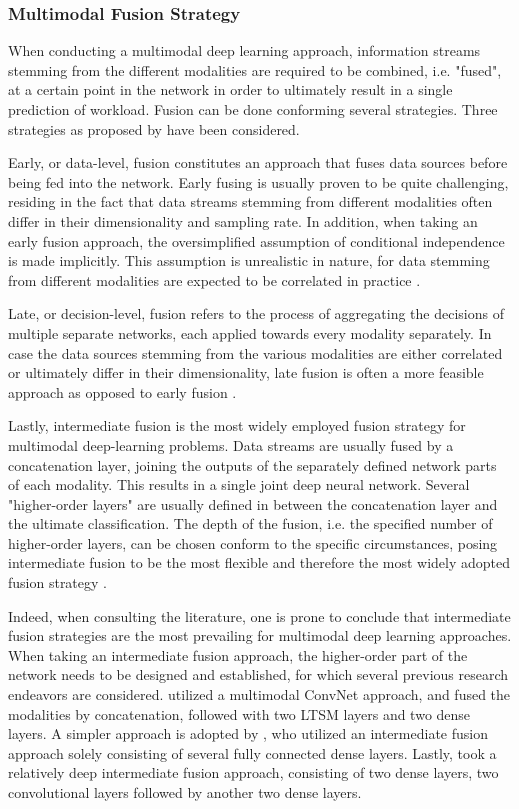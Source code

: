 \documentclass[12pt]{article}
\begin{document}
\subsubsection{Multimodal Fusion Strategy}  
When conducting a multimodal deep learning approach,  information streams stemming from the different modalities are required to be combined, i.e. "fused", at a certain point in the network in order to ultimately result in a single prediction of workload. Fusion can be done conforming several strategies. Three strategies as proposed by  have been considered.

Early, or data-level, fusion constitutes an approach that fuses data sources before being fed into the network. Early fusing is usually proven to be quite challenging, residing in the fact that data streams stemming from different modalities often differ in their dimensionality and sampling rate. In addition, when taking an early fusion approach, the oversimplified assumption of conditional independence is made implicitly. This assumption is unrealistic in nature, for data stemming from different modalities are expected to be correlated in practice \cite{ramachandram2017deep}. 

Late, or decision-level, fusion refers to the process of aggregating the decisions of multiple separate networks, each applied towards every modality separately. In case the data sources stemming from the various modalities are either correlated or ultimately differ in their dimensionality, late fusion is often a more feasible approach as opposed to early fusion \cite{ramachandram2017deep}.

Lastly, intermediate fusion is the most widely employed fusion strategy for multimodal deep-learning problems. Data streams are usually fused by a concatenation layer, joining the outputs of the separately defined network parts of each modality. This results in a single joint deep neural network. Several "higher-order layers" are usually defined in between the concatenation layer and the ultimate classification. The depth of the fusion, i.e. the specified number of higher-order layers, can be chosen conform to the specific circumstances, posing intermediate fusion to be the most flexible and therefore the most widely adopted fusion strategy \cite{ramachandram2017deep}.

Indeed, when consulting the literature, one is prone to conclude that intermediate fusion strategies are the most prevailing for multimodal deep learning approaches. When taking an intermediate fusion approach, the higher-order part of the network needs to be designed and established, for which several previous research endeavors are considered.   utilized a multimodal ConvNet approach, and fused the modalities by concatenation, followed with two LTSM layers and two dense layers. A simpler approach is adopted by , who utilized an intermediate fusion approach solely consisting of several fully connected dense layers. Lastly,  took a relatively deep intermediate fusion approach, consisting of two dense layers, two convolutional layers followed by another two dense layers.  
\end{document}
